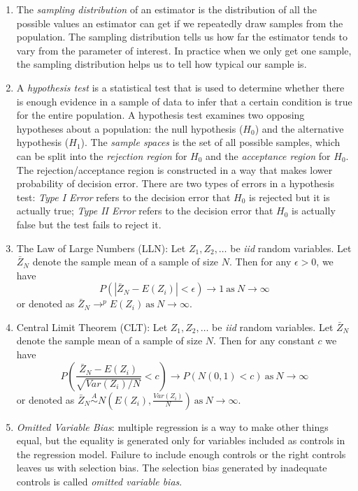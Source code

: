 \documentclass{article}
\begin{document}
\begin{enumerate}
    \item The \textit{sampling distribution} of an estimator is the distribution of all the possible values an estimator can get if we repeatedly draw samples from the population. The sampling distribution tells us how far the estimator tends to vary from the parameter of interest. In practice when we only get one sample, the sampling distribution helps us to tell how typical our sample is. 
    
    \item A \textit{hypothesis test} is a statistical test that is used to determine whether there is enough evidence in a sample of data to infer that a certain condition is true for the entire population. A hypothesis test examines two opposing hypotheses about a population: the null hypothesis ($H_0$) and the alternative hypothesis ($H_1$).  The \textit{sample spaces} is the set of all possible samples, which can be split into the \textit{rejection region} for $H_0$ and the \textit{acceptance region} for $H_0$. The rejection/acceptance region is constructed in a way that makes lower probability of decision error. There are two types of errors in a hypothesis test: \textit{Type I Error} refers to the decision error that $H_0$ is rejected but it is actually true; \textit{Type II Error} refers to the decision error that $H_0$ is actually false but the test fails to reject it. 
    
    \item The Law of Large Numbers (LLN): Let $Z_1, Z_2, \dots$ be \textit{iid} random variables. Let $\bar{Z}_N$ denote the sample mean of a sample of size $N$. Then for any $\epsilon > 0$, we have 
    $$P(|\bar{Z}_N - E(Z_i)| < \epsilon) \rightarrow 1\ \textrm{as}\ N \rightarrow \infty$$
    or denoted as $\bar{Z}_N \rightarrow^{p} E(Z_i)\ \textrm{as}\ N \rightarrow \infty $.
    
    \item Central Limit Theorem (CLT): Let $Z_1, Z_2, \dots$ be \textit{iid} random variables. Let $\bar{Z}_N$ denote the sample mean of a sample of size $N$. Then for any constant $c$ we have 
    $$P\left( \frac{\bar{Z}_N-E(Z_i)}{\sqrt{Var(Z_i)/N}} < c \right) \rightarrow P(N(0,1) < c)\ \textrm{as}\ N \rightarrow \infty$$
    or denoted as $\bar{Z}_N \overset{A}{\sim} N\left( E(Z_i), \frac{Var(Z_i)}{N} \right)\ \textrm{as}\ N \rightarrow \infty$.
    
    \item \textit{Omitted Variable Bias}: multiple regression is a way to make other things equal, but the equality is generated only for variables included as controls in the regression model. Failure to include enough controls or the right controls leaves us with selection bias. The selection bias generated by inadequate controls is called \textit{omitted variable bias}.
    

\end{enumerate}
\end{document}

